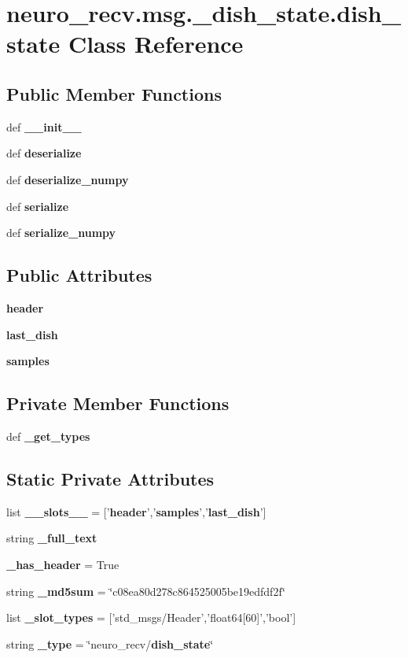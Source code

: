 \section{neuro\-\_\-recv.\-msg.\-\_\-dish\-\_\-state.\-dish\-\_\-state \-Class \-Reference}
\label{classneuro__recv_1_1msg_1_1__dish__state_1_1dish__state}
\subsection*{\-Public \-Member \-Functions}
\begin{DoxyCompactItemize}
\item 
def {\bf \-\_\-\-\_\-init\-\_\-\-\_\-}
\item 
def {\bf deserialize}
\item 
def {\bf deserialize\-\_\-numpy}
\item 
def {\bf serialize}
\item 
def {\bf serialize\-\_\-numpy}
\end{DoxyCompactItemize}
\subsection*{\-Public \-Attributes}
\begin{DoxyCompactItemize}
\item 
{\bf header}
\item 
{\bf last\-\_\-dish}
\item 
{\bf samples}
\end{DoxyCompactItemize}
\subsection*{\-Private \-Member \-Functions}
\begin{DoxyCompactItemize}
\item 
def {\bf \-\_\-get\-\_\-types}
\end{DoxyCompactItemize}
\subsection*{\-Static \-Private \-Attributes}
\begin{DoxyCompactItemize}
\item 
list {\bf \-\_\-\-\_\-slots\-\_\-\-\_\-} = ['{\bf header}','{\bf samples}','{\bf last\-\_\-dish}']
\item 
string {\bf \-\_\-full\-\_\-text}
\item 
{\bf \-\_\-has\-\_\-header} = \-True
\item 
string {\bf \-\_\-md5sum} = \char`\"{}c08ea80d278c864525005be19edfdf2f\char`\"{}
\item 
list {\bf \-\_\-slot\-\_\-types} = ['std\-\_\-msgs/\-Header','float64[60]','bool']
\item 
string {\bf \-\_\-type} = \char`\"{}neuro\-\_\-recv/{\bf dish\-\_\-state}\char`\"{}
\end{DoxyCompactItemize}


